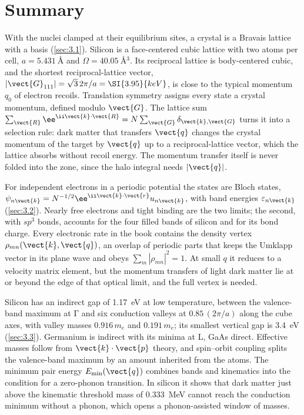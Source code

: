 \section*{Summary}

With the nuclei clamped at their equilibrium sites, a crystal is a Bravais lattice with a basis (\cref{sec:3.1}). Silicon is a face-centered cubic lattice with two atoms per cell, $a = \SI{5.431}{\angstrom}$ and $\Omega = \SI{40.05}{\angstrom^3}$. Its reciprocal lattice is body-centered cubic, and the shortest reciprocal-lattice vector, $|\vect{G}_{111}| = \sqrt3\,2\pi/a = \SI{3.95}{keV}$, is close to the typical momentum $q_0$ of electron recoils. Translation symmetry assigns every state a crystal momentum, defined modulo $\vect{G}$. The lattice sum $\sum_{\vect{R}}\ee^{\ii\vect{k}\cdot\vect{R}} = N\sum_{\vect{G}}\delta_{\vect{k},\vect{G}}$ turns it into a selection rule: dark matter that transfers $\vect{q}$ changes the crystal momentum of the target by $\vect{q}$ up to a reciprocal-lattice vector, which the lattice absorbs without recoil energy. The momentum transfer itself is never folded into the zone, since the halo integral needs $|\vect{q}|$.

For independent electrons in a periodic potential the states are Bloch states, $\psi_{n\vect{k}} = N^{-1/2}\ee^{\ii\vect{k}\cdot\vect{r}}u_{n\vect{k}}$, with band energies $\varepsilon_{n\vect{k}}$ (\cref{sec:3.2}). Nearly free electrons and tight binding are the two limits; the second, with $sp^3$ bonds, accounts for the four filled bands of silicon and for its bond charge. Every electronic rate in the book contains the density vertex $\rho_{mn}(\vect{k},\vect{q})$, an overlap of periodic parts that keeps the Umklapp vector in its plane wave and obeys $\sum_m|\rho_{mn}|^2 = 1$. At small $q$ it reduces to a velocity matrix element, but the momentum transfers of light dark matter lie at or beyond the edge of that optical limit, and the full vertex is needed.

Silicon has an indirect gap of \SI{1.17}{eV} at low temperature, between the valence-band maximum at $\mathrm{\Gamma}$ and six conduction valleys at $0.85\,(2\pi/a)$ along the cube axes, with valley masses $0.916\,m_e$ and $0.191\,m_e$; its smallest vertical gap is \SI{3.4}{eV} (\cref{sec:3.3}). Germanium is indirect with its minima at L, GaAs direct. Effective masses follow from $\vect{k}\cdot\vect{p}$ theory, and spin--orbit coupling splits the valence-band maximum by an amount inherited from the atoms. The minimum pair energy $E_{\mathrm{min}}(\vect{q})$ combines bands and kinematics into the condition for a zero-phonon transition. In silicon it shows that dark matter just above the kinematic threshold mass of \SI{0.333}{MeV} cannot reach the conduction minimum without a phonon, which opens a phonon-assisted window of masses.

